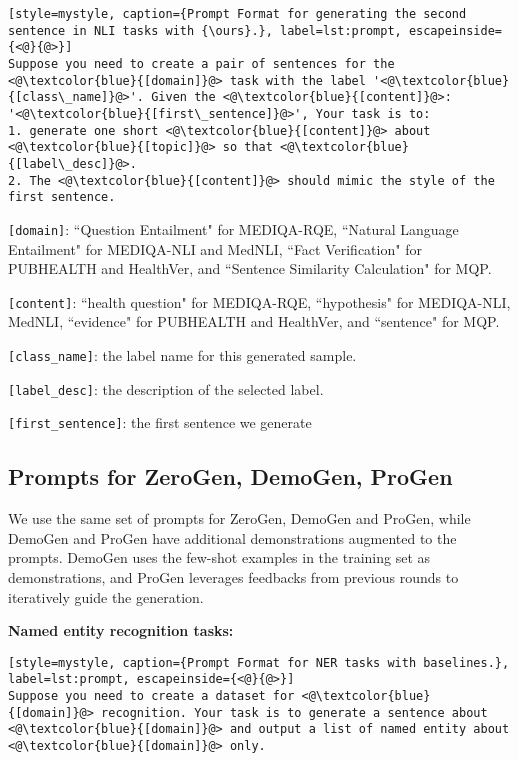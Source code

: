 \documentclass{article} %
\newcommand{\ours}{\textsc{ClinGen}\xspace}
\begin{document}
\begin{lstlisting}[style=mystyle, caption={Prompt Format for generating the second sentence in NLI tasks with {\ours}.}, label=lst:prompt, escapeinside={<@}{@>}]
Suppose you need to create a pair of sentences for the <@\textcolor{blue}{[domain]}@> task with the label '<@\textcolor{blue}{[class\_name]}@>'. Given the <@\textcolor{blue}{[content]}@>: '<@\textcolor{blue}{[first\_sentence]}@>', Your task is to:
1. generate one short <@\textcolor{blue}{[content]}@> about <@\textcolor{blue}{[topic]}@> so that <@\textcolor{blue}{[label\_desc]}@>.
2. The <@\textcolor{blue}{[content]}@> should mimic the style of the first sentence.
\end{lstlisting}
\texttt{[domain]}: ``Question Entailment" for MEDIQA-RQE, ``Natural Language Entailment" for MEDIQA-NLI and MedNLI, ``Fact Verification" for PUBHEALTH and HealthVer, and ``Sentence Similarity Calculation" for MQP.

\texttt{[content]}: ``health question" for MEDIQA-RQE, ``hypothesis" for MEDIQA-NLI, MedNLI, ``evidence" for PUBHEALTH and HealthVer, and ``sentence" for MQP.

\texttt{[class\_name]}: the label name for this generated sample.

\texttt{[label\_desc]}: the description of the selected label.

\texttt{[first\_sentence]}: the first sentence we generate

\subsection{Prompts for ZeroGen, DemoGen, ProGen}
\label{sec:prompt_format_bsl}
We use the same set of prompts for ZeroGen, DemoGen and ProGen, while DemoGen and ProGen have additional demonstrations augmented to the prompts. DemoGen uses the few-shot examples in the training set as demonstrations, and ProGen leverages feedbacks from previous rounds to iteratively guide the generation.

\textbf{Named entity recognition tasks:}

\begin{lstlisting}[style=mystyle, caption={Prompt Format for NER tasks with baselines.}, label=lst:prompt, escapeinside={<@}{@>}]
Suppose you need to create a dataset for <@\textcolor{blue}{[domain]}@> recognition. Your task is to generate a sentence about <@\textcolor{blue}{[domain]}@> and output a list of named entity about <@\textcolor{blue}{[domain]}@> only.
\end{lstlisting}
\end{document}
